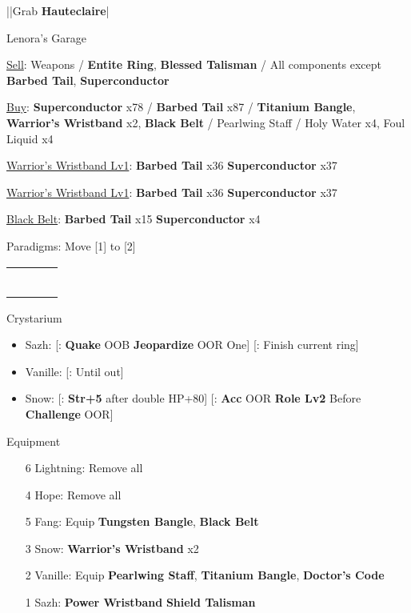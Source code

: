 \begin{mainlist}
	\item \skip|\skip|Grab \textbf{Hauteclaire}|\skip
\end{mainlist}
\begin{shop}{Lenora's Garage}
	\item \underline{Sell}: Weapons / \textbf{Entite Ring}, \textbf{Blessed Talisman} / All components except \textbf{Barbed Tail}, \textbf{Superconductor}
	\item \underline{Buy}: \textbf{Superconductor} x78 / \textbf{Barbed Tail} x87 / \textbf{Titanium Bangle}, \textbf{Warrior's Wristband} x2, \textbf{Black Belt} / Pearlwing Staff / Holy Water x4, Foul Liquid x4
\end{shop}
\begin{upgrade}
	\item \underline{Warrior's Wristband Lv1}: \textbf{Barbed Tail} x36 \to \textbf{Superconductor} x37
	\item \underline{Warrior's Wristband Lv1}: \textbf{Barbed Tail} x36 \to \textbf{Superconductor} x37
	\item \underline{Black Belt}: \textbf{Barbed Tail} x15 \to \textbf{Superconductor} x4
\end{upgrade}
\begin{menu}
	\item Paradigms: Move [1] to [2]
	\begin{tabular}{cccl}
		\chrole{\syn} & \sab & \rav &  \\
		\com          & \med & \com &          \\
		\syn          & \med & \com &          \\
		\com          & \sab & \com &          \\
		\syn          & \sab & \com &          \\
		\com          & \rav & \com &
	\end{tabular}
	\item Crystarium
	\begin{itemize}
		\item Sazh: [\com: \textbf{Quake} OOB \to \textbf{Jeopardize} OOR \to One] [\rav: Finish current ring]
		\item Vanille: [\med: Until out]
		\item Snow: [\rav: \textbf{Str+5} after double HP+80] [\sen: \textbf{Acc} OOR \to \textbf{Role Lv2} \to Before \textbf{Challenge} OOR]
	\end{itemize}
	\item Equipment
	\begin{itemize}
		\item [6] Lightning: Remove all
		\item [4] Hope: Remove all
		\item [5] Fang: Equip \textbf{Tungsten Bangle}, \textbf{Black Belt}
		\item [3] Snow: \textbf{Warrior's Wristband\star} x2
		\item [2] Vanille: Equip \textbf{Pearlwing Staff}, \textbf{Titanium Bangle}, \textbf{Doctor's Code}
		\item [1] Sazh: \textbf{Power Wristband} \to \textbf{Shield Talisman}
	\end{itemize}
\end{menu}
